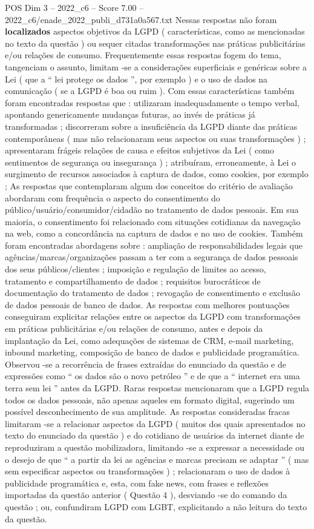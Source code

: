 \begin{textsample}{POS Dim 3 – 2022\_c6 – Score 7.00 – 2022\_c6/enade\_2022\_publi\_d731a0a567.txt}
Nessas respostas não foram \textbf{localizados} aspectos objetivos da LGPD ( características, como as mencionadas no texto da questão ) ou sequer citadas transformações nas práticas publicitárias e/ou relações de consumo.
Frequentemente essas respostas fogem do tema, tangenciam o assunto, limitam -se a considerações superficiais e genéricas sobre a Lei ( que a “ lei protege os dados ”, por exemplo ) e o uso de dados na comunicação ( se a LGPD é boa ou ruim ).
Com essas características também foram encontradas respostas que : utilizaram inadequadamente o tempo verbal, apontando genericamente mudanças futuras, ao invés de práticas já transformadas ; discorreram sobre a insuficiência da LGPD diante das práticas contemporâneas ( mas não relacionaram seus aspectos ou suas transformações ) ; apresentaram frágeis relações de causa e efeitos subjetivos da Lei ( como sentimentos de segurança ou insegurança ) ; atribuíram, erroneamente, à Lei o surgimento de recursos associados à captura de dados, como cookies, por exemplo ; As respostas que contemplaram algum dos conceitos do critério de avaliação abordaram com frequência o aspecto do consentimento do público/usuário/consumidor/cidadão no tratamento de dados pessoais.
Em sua maioria, o consentimento foi relacionado com situações cotidianas da navegação na web, como a concordância na captura de dados e no uso de cookies.
Também foram encontradas abordagens sobre : ampliação de responsabilidades legais que agências/marcas/organizações passam a ter com a segurança de dados pessoais dos seus públicos/clientes ; imposição e regulação de limites ao acesso, tratamento e compartilhamento de dados ; requisitos burocráticos de documentação do tratamento de dados ; revogação de consentimento e exclusão de dados pessoais de banco de dados.
As respostas com melhores pontuações conseguiram explicitar relações entre os aspectos da LGPD com transformações em práticas publicitárias e/ou relações de consumo, antes e depois da implantação da Lei, como adequações de sistemas de CRM, e-mail marketing, inbound marketing, composição de banco de dados e publicidade programática.
Observou -se a recorrência de frases extraídas do enunciado da questão e de expressões como “ os dados são o novo petróleo ” e de que a “ internet era uma terra sem lei ” antes da LGPD.
Raras respostas mencionaram que a LGPD regula todos os dados pessoais, não apenas aqueles em formato digital, sugerindo um possível desconhecimento de sua amplitude.
As respostas consideradas fracas limitaram -se a relacionar aspectos da LGPD ( muitos dos quais apresentados no texto do enunciado da questão ) e do cotidiano de usuários da internet diante de reproduziram a questão mobilizadora, limitando -se a expressar a necessidade ou o desejo de que “ a partir da lei as agências e marcas precisam se adaptar ” ( mas sem especificar aspectos ou transformações ) ; relacionaram o uso de dados à publicidade programática e, esta, com fake news, com frases e reflexões importadas da questão anterior ( Questão 4 ), desviando -se do comando da questão ; ou, confundiram LGPD com LGBT, explicitando a não leitura do texto da questão.

\end{textsample}
